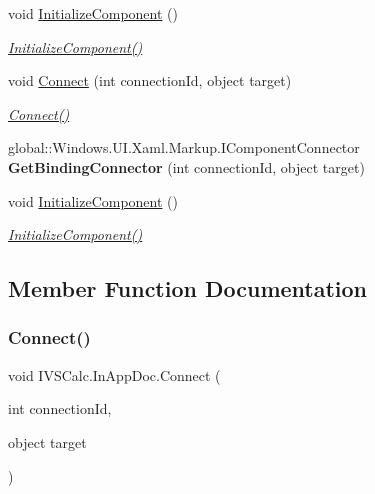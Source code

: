 \begin{DoxyCompactItemize}
\item 
void \hyperlink{class_i_v_s_calc_1_1_in_app_doc_aaea69e2cf03d01b3fcd38f048dbeb569}{Initialize\+Component} ()
\begin{DoxyCompactList}\small\item\em \hyperlink{class_i_v_s_calc_1_1_in_app_doc_aaea69e2cf03d01b3fcd38f048dbeb569}{Initialize\+Component()} \end{DoxyCompactList}\item 
void \hyperlink{class_i_v_s_calc_1_1_in_app_doc_a470427a176a8d7a0de6c0b82a9a45c4b}{Connect} (int connection\+Id, object target)
\begin{DoxyCompactList}\small\item\em \hyperlink{class_i_v_s_calc_1_1_in_app_doc_a470427a176a8d7a0de6c0b82a9a45c4b}{Connect()} \end{DoxyCompactList}\item 
\mbox{\label{class_i_v_s_calc_1_1_in_app_doc_a98bf2af895c0ebf86088946fabacd814}} 
global\+::\+Windows.\+U\+I.\+Xaml.\+Markup.\+I\+Component\+Connector {\bfseries Get\+Binding\+Connector} (int connection\+Id, object target)
\item 
void \hyperlink{class_i_v_s_calc_1_1_in_app_doc_aaea69e2cf03d01b3fcd38f048dbeb569}{Initialize\+Component} ()
\begin{DoxyCompactList}\small\item\em \hyperlink{class_i_v_s_calc_1_1_in_app_doc_aaea69e2cf03d01b3fcd38f048dbeb569}{Initialize\+Component()} \end{DoxyCompactList}\end{DoxyCompactItemize}


\subsection{Member Function Documentation}
\mbox{\label{class_i_v_s_calc_1_1_in_app_doc_a470427a176a8d7a0de6c0b82a9a45c4b}} 
\subsubsection{\texorpdfstring{Connect()}{Connect()}\hspace{0.1cm}{\footnotesize\ttfamily [1/5]}}
{\footnotesize\ttfamily void I\+V\+S\+Calc.\+In\+App\+Doc.\+Connect (\begin{DoxyParamCaption}\item[{int}]{connection\+Id,  }\item[{object}]{target }\end{DoxyParamCaption})}



